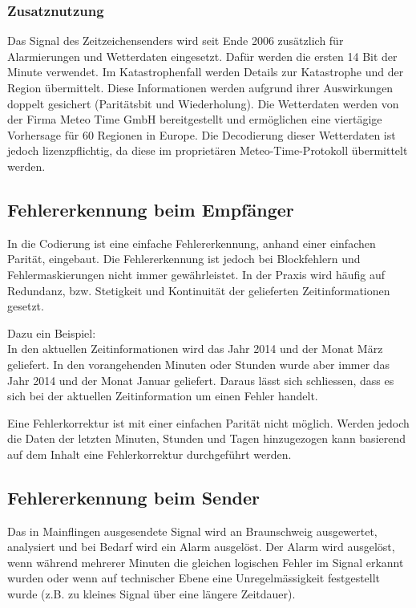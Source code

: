 \subsubsection{Zusatznutzung}
Das Signal des Zeitzeichensenders wird seit Ende 2006 zusätzlich für Alarmierungen und Wetterdaten eingesetzt. Dafür werden die ersten 14 Bit der Minute verwendet. Im Katastrophenfall werden Details zur Katastrophe und der Region übermittelt. Diese Informationen werden aufgrund ihrer Auswirkungen doppelt gesichert (Paritätsbit und Wiederholung). Die Wetterdaten werden von der Firma Meteo Time GmbH bereitgestellt und ermöglichen eine viertägige Vorhersage für 60 Regionen in Europe. Die Decodierung dieser Wetterdaten ist jedoch lizenzpflichtig, da diese im proprietären Meteo-Time-Protokoll übermittelt werden.

\subsection{Fehlererkennung beim Empfänger}
In die Codierung ist eine einfache Fehlererkennung, anhand einer einfachen Parität, eingebaut. Die Fehlererkennung ist jedoch bei Blockfehlern und Fehlermaskierungen nicht immer gewährleistet. In der Praxis wird häufig auf Redundanz, bzw. Stetigkeit und Kontinuität der gelieferten Zeitinformationen gesetzt.

Dazu ein Beispiel:\\
In den aktuellen Zeitinformationen wird das Jahr 2014 und der Monat März geliefert. In den vorangehenden Minuten oder Stunden wurde aber immer das Jahr 2014 und der Monat Januar geliefert. Daraus lässt sich schliessen, dass es sich bei der aktuellen Zeitinformation um einen Fehler handelt.

Eine Fehlerkorrektur ist mit einer einfachen Parität nicht möglich. Werden jedoch die Daten der letzten Minuten, Stunden und Tagen hinzugezogen kann basierend auf dem Inhalt eine Fehlerkorrektur durchgeführt werden.

\subsection{Fehlererkennung beim Sender}
Das in Mainflingen ausgesendete Signal wird an Braunschweig ausgewertet, analysiert und bei Bedarf wird ein Alarm ausgelöst. Der Alarm wird ausgelöst, wenn während mehrerer Minuten die gleichen logischen Fehler im Signal erkannt wurden oder wenn auf technischer Ebene eine Unregelmässigkeit festgestellt wurde (z.B. zu kleines Signal über eine längere Zeitdauer).

